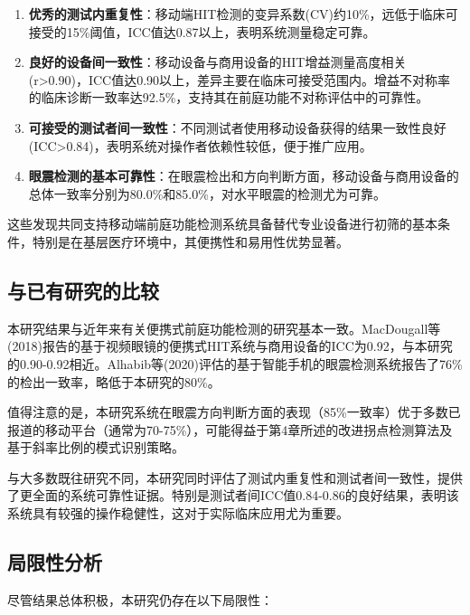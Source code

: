 \begin{enumerate}
  \item \textbf{优秀的测试内重复性}：移动端HIT检测的变异系数(CV)约10\%，远低于临床可接受的15\%阈值，ICC值达0.87以上，表明系统测量稳定可靠。

  \item \textbf{良好的设备间一致性}：移动设备与商用设备的HIT增益测量高度相关(r>0.90)，ICC值达0.90以上，差异主要在临床可接受范围内。增益不对称率的临床诊断一致率达92.5\%，支持其在前庭功能不对称评估中的可靠性。

  \item \textbf{可接受的测试者间一致性}：不同测试者使用移动设备获得的结果一致性良好(ICC>0.84)，表明系统对操作者依赖性较低，便于推广应用。

  \item \textbf{眼震检测的基本可靠性}：在眼震检出和方向判断方面，移动设备与商用设备的总体一致率分别为80.0\%和85.0\%，对水平眼震的检测尤为可靠。
\end{enumerate}

这些发现共同支持移动端前庭功能检测系统具备替代专业设备进行初筛的基本条件，特别是在基层医疗环境中，其便携性和易用性优势显著。

\subsection{与已有研究的比较}

本研究结果与近年来有关便携式前庭功能检测的研究基本一致。MacDougall等(2018)报告的基于视频眼镜的便携式HIT系统与商用设备的ICC为0.92，与本研究的0.90-0.92相近。Alhabib等(2020)评估的基于智能手机的眼震检测系统报告了76\%的检出一致率，略低于本研究的80\%。

值得注意的是，本研究系统在眼震方向判断方面的表现（85\%一致率）优于多数已报道的移动平台（通常为70-75\%），可能得益于第4章所述的改进拐点检测算法及基于斜率比例的模式识别策略。

与大多数既往研究不同，本研究同时评估了测试内重复性和测试者间一致性，提供了更全面的系统可靠性证据。特别是测试者间ICC值0.84-0.86的良好结果，表明该系统具有较强的操作稳健性，这对于实际临床应用尤为重要。

\subsection{局限性分析}

尽管结果总体积极，本研究仍存在以下局限性：

